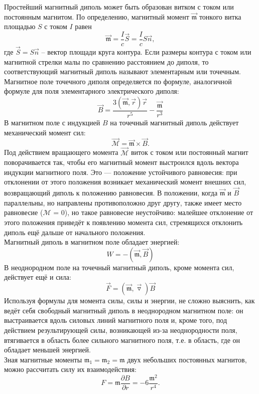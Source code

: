 \documentclass[a4paper, 12pt]{article}%
\begin{document}
	Простейший магнитный диполь может быть образован витком с током или постоянным магнитом. По определению, магнитный момент $\overrightarrow{\mathfrak m }$ тонкого витка площадью $S$ с током $I$ равен
	$$
	\overrightarrow{\mathfrak m}=\dfrac{I}{c}\vec{S}=\dfrac{I}{c}S\vec{n},
	$$
	где $\vec{S}=S\vec{n}$ -- вектор площади круга контура. Если размеры контура с током или магнитной стрелки малы по сравнению расстоянием до диполя, то соответствующий магнитный диполь называют элементарным или точечным.\\
	Магнитное поле точечного диполя определяется по формуле, аналогичной формуле для поля
	элементарного электрического диполя:
	$$
	\vec{B}=\dfrac{3(\overrightarrow{\mathfrak m},\vec{r})\vec{r}}{r^5} - \dfrac{\overrightarrow{\mathfrak m}}{r^3}
	$$ 
	В магнитном поле с индукцией $B$
	на точечный магнитный диполь 
	действует механический
	момент сил:
	$$
	\vec{\mathcal M} = \overrightarrow{\mathfrak m}\times \vec{B}.
	$$
	Под действием вращающего момента $\vec{\mathcal M}$ виток с током или постоянный магнит поворачивается
	так, чтобы его магнитный момент выстроился вдоль вектора индукции магнитного поля. Это —
	положение устойчивого равновесия: при отклонении от этого положения возникает механический
	момент внешних сил, возвращающий диполь к положению равновесия. В положении, когда $\overrightarrow{\mathfrak m}$ и $\vec{B}$
	параллельны, но направлены противоположно друг другу, также имеет место равновесие ($\mathcal M$ = 0),
	но такое равновесие неустойчиво: малейшее отклонение от этого положения приведёт к появлению
	момента сил, стремящихся отклонить диполь ещё дальше от начального положения.\\
	Магнитный диполь в магнитном поле обладает энергией:
	$$
	W = -(\overrightarrow{\mathfrak m},\vec{B})
	$$
	В неоднородном поле на точечный магнитный диполь, кроме момента сил, действует ещё и сила:
	$$
	\vec{F}=(\overrightarrow{\mathfrak m},\vec{\triangledown})\vec{B}
	$$
	Используя формулы для момента силы, силы и энергии, не сложно выяснить, как ведёт себя
	свободный магнитный диполь в неоднородном магнитном поле: он выстраивается вдоль силовых
	линий магнитного поля и, кроме того, под действием результирующей силы, возникающей из-за
	неоднородности поля, втягивается в область более сильного магнитного поля, т.е. в область, где он
	обладает меньшей энергией.\\
	Зная магнитные моменты $\mathfrak {m_1} = \mathfrak {m_2}  = \mathfrak m$ двух небольших постоянных магнитов, можно рассчитать силу
	их взаимодействия:
	$$
	F = \mathfrak m \dfrac{\partial B}{\partial r}=-6\dfrac{\mathfrak m^2}{r^4}.
	$$
	
\end{document}
